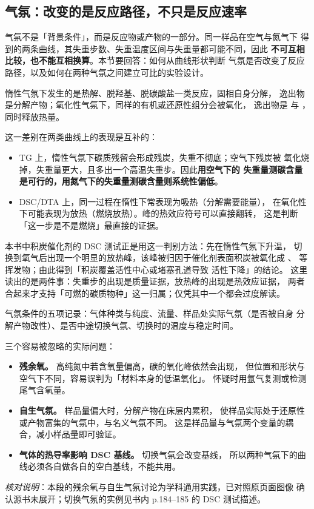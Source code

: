 \subsection{气氛：改变的是反应路径，不只是反应速率}

\begin{probout}
气氛不是「背景条件」，而是反应物或产物的一部分。同一样品在空气与氮气下
得到的两条曲线，其失重步数、失重温度区间与失重量都可能不同，因此
\textbf{不可互相比较，也不能互相换算}。本节要回答：如何从曲线形状判断
气氛是否改变了反应路径，以及如何在两种气氛之间建立可比的实验设计。
\end{probout}

\begin{principle}
惰性气氛下发生的是热解、脱羟基、脱碳酸盐一类反应，固相自身分解，
逸出物是分解产物；氧化性气氛下，同样的有机或还原性组分会被氧化，
逸出物是  与 ，同时释放热量。

这一差别在两类曲线上的表现是互补的：
\begin{itemize}
  \item TG 上，惰性气氛下碳质残留会形成残炭，失重不彻底；空气下残炭被
  氧化烧掉，失重量更大，且多出一个高温失重步。因此\textbf{用空气下的
  失重量测碳含量是可行的，用氮气下的失重量测碳含量则系统性偏低}。
  \item DSC/DTA 上，同一过程在惰性下常表现为吸热（分解需要能量），
  在氧化性下可能表现为放热（燃烧放热）。峰的热效应符号可以直接翻转，
  这是判断「这一步是不是燃烧」最直接的证据。
\end{itemize}
本书中积炭催化剂的 DSC 测试正是用这一判别方法：先在惰性气氛下升温，
切换到氧气后出现一个明显的放热峰，该峰被归因于催化剂表面积炭被氧化成
、 等挥发物；由此得到「积炭覆盖活性中心或堵塞孔道导致
活性下降」的结论。
这里读出的是两件事：失重步的出现是质量证据，放热峰的出现是热效应证据，
两者合起来才支持「可燃的碳质物种」这一归属；仅凭其中一个都会过度解读。
\end{principle}

\begin{measure}
气氛条件的五项记录：气体种类与纯度、流量、样品处实际气氛（是否被自身
分解产物改性）、是否中途切换气氛、切换时的温度与稳定时间。

三个容易被忽略的实际问题：
\begin{itemize}
  \item \textbf{残余氧。} 高纯氮中若含氧量偏高，碳的氧化峰依然会出现，
  但位置和形状与空气下不同，容易误判为「材料本身的低温氧化」。
  怀疑时用氩气复测或检测尾气含氧量。
  \item \textbf{自生气氛。} 样品量偏大时，分解产物在床层内累积，
  使样品实际处于还原性或产物富集的气氛中，与名义气氛不同。
  这是样品量与气氛两个变量的耦合，减小样品量即可验证。
  \item \textbf{气体的热导率影响 DSC 基线。} 切换气氛会改变基线，
  所以两种气氛下的曲线必须各自做各自的空白基线，不能共用。
\end{itemize}
\emph{核对说明}：本段的残余氧与自生气氛讨论为学科通用实践，已对照原页面图像
确认源书未展开；切换气氛的实例见书内 p.184--185 的 DSC 测试描述。
\end{measure}

